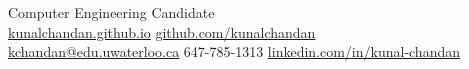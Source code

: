 \documentclass[]{chandan-cv}
\begin{document}
%
%

%
%
{
	Computer Engineering Candidate \\
	\href{http://kunalchandan.github.io}{kunalchandan.github.io}
	\hfill
	\href{http://github.com/kunalchandan}{github.com/kunalchandan}\\
	\href{mailto:kchandan@edu.uwaterloo.ca}{kchandan@edu.uwaterloo.ca}
	\hfill
	647-785-1313
	\hfill
	\href{https://www.linkedin.com/in/kunal-chandan/}{linkedin.com/in/kunal-chandan}
}

%
%
\end{document}
